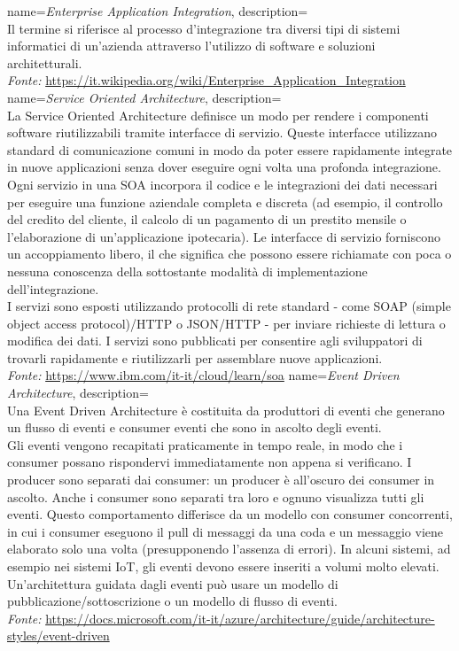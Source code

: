 
{
    name=\textit{Enterprise Application Integration},
    description={\hfill \\
    Il termine si riferisce al processo d'integrazione tra diversi tipi di sistemi informatici di un'azienda attraverso l'utilizzo di software e soluzioni architetturali.
    \hfill \\
    {\footnotesize{\textit{Fonte:} \url{https://it.wikipedia.org/wiki/Enterprise_Application_Integration}}}
    }
}
{
    name=\textit{Service Oriented Architecture},
    description={\hfill \\
    La Service Oriented Architecture definisce un modo per rendere i componenti software riutilizzabili tramite interfacce di servizio. Queste interfacce utilizzano standard di comunicazione comuni in modo da poter essere rapidamente integrate in nuove applicazioni senza dover eseguire ogni volta una profonda integrazione.\\
    Ogni servizio in una SOA incorpora il codice e le integrazioni dei dati necessari per eseguire una funzione aziendale completa e discreta (ad esempio, il controllo del credito del cliente, il calcolo di un pagamento di un prestito mensile o l'elaborazione di un'applicazione ipotecaria). Le interfacce di servizio forniscono un accoppiamento libero, il che significa che possono essere richiamate con poca o nessuna conoscenza della sottostante modalità di implementazione dell'integrazione.\\
    I servizi sono esposti utilizzando protocolli di rete standard - come SOAP (simple object access protocol)/HTTP o JSON/HTTP - per inviare richieste di lettura o modifica dei dati. I servizi sono pubblicati per consentire agli sviluppatori di trovarli rapidamente e riutilizzarli per assemblare nuove applicazioni.
    \hfill \\
    {\footnotesize\textit{Fonte:} \url{https://www.ibm.com/it-it/cloud/learn/soa}}
    }
}
{
    name=\textit{Event Driven Architecture},
    description={\hfill \\
    Una Event Driven Architecture è costituita da produttori di eventi che generano un flusso di eventi e consumer eventi che sono in ascolto degli eventi.\\
    Gli eventi vengono recapitati praticamente in tempo reale, in modo che i consumer possano rispondervi immediatamente non appena si verificano. I producer sono separati dai consumer: un producer è all'oscuro dei consumer in ascolto. Anche i consumer sono separati tra loro e ognuno visualizza tutti gli eventi. Questo comportamento differisce da un modello con consumer concorrenti, in cui i consumer eseguono il pull di messaggi da una coda e un messaggio viene elaborato solo una volta (presupponendo l'assenza di errori). In alcuni sistemi, ad esempio nei sistemi IoT, gli eventi devono essere inseriti a volumi molto elevati. \\
    Un'architettura guidata dagli eventi può usare un modello di pubblicazione/sottoscrizione o un modello di flusso di eventi.
    \hfill \\
    {\footnotesize\textit{Fonte:} \url{https://docs.microsoft.com/it-it/azure/architecture/guide/architecture-styles/event-driven}}
    }
}
